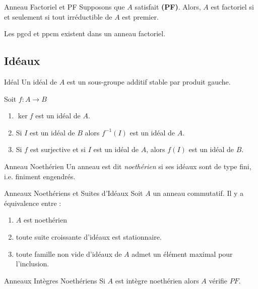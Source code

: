 \documentclass{cours}
\begin{document}
\begin{propositionfr}{Anneau Factoriel et PF}{}
    Supposons que $A$ satisfait \textbf{(PF)}. Alors, $A$ est factoriel si et seulement si tout irréductible de $A$ est premier.
\end{propositionfr}

\begin{lemma}
    Les pgcd et ppcm existent dans un anneau factoriel.
\end{lemma}

\subsection{Idéaux}
\begin{définition}{Idéal}{}
    Un idéal de $A$ est un sous-groupe additif stable par produit gauche.
\end{définition}

\begin{lemma}
    Soit $f : A\rightarrow B$
    \begin{enumerate}
        \item $\ker f$ est un idéal de $A$.
        \item Si $I$ est un idéal de $B$ alors $f^{-1}(I)$ est un idéal de $A$.
        \item Si $f$ est surjective et si $I$ est un idéal de $A$, alors $f(I)$ est un idéal de $B$.
    \end{enumerate}
\end{lemma}

\begin{définition}{Anneau Noethérien}{}
    Un anneau est dit \emph{noethérien} si ses idéaux sont de type fini, i.e. finiment engendrés.
\end{définition}

\begin{propositionfr}{Anneaux Noethériens et Suites d'Idéaux}{}
    Soit $A$ un anneau commutatif. Il y a équivalence entre :
    \begin{enumerate}
        \item $A$ est noethérien
        \item toute suite croissante d'idéaux est stationnaire.
        \item toute famille non vide d'idéaux de $A$ admet un élément maximal pour l'inclusion.
    \end{enumerate}
\end{propositionfr}

\begin{propositionfr}{Anneaux Intègres Noethériens}{}
    Si $A$ est intègre noethérien alors $A$ vérifie $PF$.
\end{propositionfr}
\end{document}
